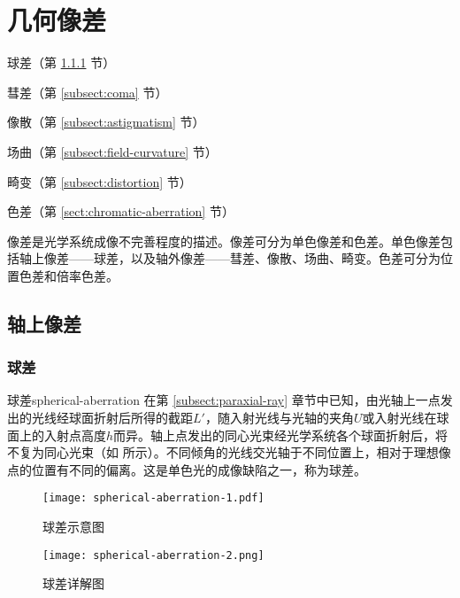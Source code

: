 \chapter{几何像差}

\begin{introduction}
	\item 球差（第 \ref{subsect:spherical-aberration} 节）
	\item 彗差（第 \ref{subsect:coma} 节）
	\item 像散（第 \ref{subsect:astigmatism} 节）
	\item 场曲（第 \ref{subsect:field-curvature} 节）
	\item 畸变（第 \ref{subsect:distortion} 节）
	\item 色差（第 \ref{sect:chromatic-aberration} 节）
\end{introduction}

像差是光学系统成像不完善程度的描述。像差可分为单色像差和色差。单色像差包括轴上像差——球差，以及轴外像差——彗差、像散、场曲、畸变。色差可分为位置色差和倍率色差。
\section{轴上像差}
\subsection{球差}
\label{subsect:spherical-aberration}
\begin{definition}{球差}{spherical-aberration}
在第 \ref{subsect:paraxial-ray} 章节中已知，由光轴上一点发出的光线经球面折射后所得的截距$L'$，随入射光线与光轴的夹角$U$或入射光线在球面上的入射点高度$h$而异。轴上点发出的同心光束经光学系统各个球面折射后，将不复为同心光束（如 所示）。不同倾角的光线交光轴于不同位置上，相对于理想像点的位置有不同的偏离。这是单色光的成像缺陷之一，称为球差。
\end{definition}

\begin{figure}[htbp]
	\centering
	\begin{minipage}[t]{0.3\textwidth}
		\centering
		\texttt{[image: spherical-aberration-1.pdf]}
		\caption{球差示意图}
		\label{fig:spherical-aberration-1}
	\end{minipage}
	\quad
	\begin{minipage}[t]{0.65\textwidth}
		\centering
		\texttt{[image: spherical-aberration-2.png]}
		\caption{球差详解图}
		\label{fig:spherical-aberration-2}
	\end{minipage}
\end{figure}

